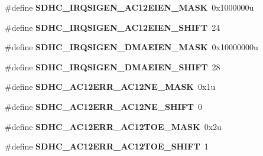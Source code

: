 \begin{DoxyCompactItemize}
\item 
\#define {\bfseries S\+D\+H\+C\+\_\+\+I\+R\+Q\+S\+I\+G\+E\+N\+\_\+\+A\+C12\+E\+I\+E\+N\+\_\+\+M\+A\+SK}~0x1000000u\hypertarget{group__SDHC__Register__Masks_gacd242a1e4fdf5a31371c37720b6c5067}{}\label{group__SDHC__Register__Masks_gacd242a1e4fdf5a31371c37720b6c5067}

\item 
\#define {\bfseries S\+D\+H\+C\+\_\+\+I\+R\+Q\+S\+I\+G\+E\+N\+\_\+\+A\+C12\+E\+I\+E\+N\+\_\+\+S\+H\+I\+FT}~24\hypertarget{group__SDHC__Register__Masks_gad4b0bff90f4a58266dbbcc018d9b4b56}{}\label{group__SDHC__Register__Masks_gad4b0bff90f4a58266dbbcc018d9b4b56}

\item 
\#define {\bfseries S\+D\+H\+C\+\_\+\+I\+R\+Q\+S\+I\+G\+E\+N\+\_\+\+D\+M\+A\+E\+I\+E\+N\+\_\+\+M\+A\+SK}~0x10000000u\hypertarget{group__SDHC__Register__Masks_gae22dd330ad7d3c84dc6906ad0303ccc5}{}\label{group__SDHC__Register__Masks_gae22dd330ad7d3c84dc6906ad0303ccc5}

\item 
\#define {\bfseries S\+D\+H\+C\+\_\+\+I\+R\+Q\+S\+I\+G\+E\+N\+\_\+\+D\+M\+A\+E\+I\+E\+N\+\_\+\+S\+H\+I\+FT}~28\hypertarget{group__SDHC__Register__Masks_gaceacd386a2b3cdab5975252cf61ad06c}{}\label{group__SDHC__Register__Masks_gaceacd386a2b3cdab5975252cf61ad06c}

\item 
\#define {\bfseries S\+D\+H\+C\+\_\+\+A\+C12\+E\+R\+R\+\_\+\+A\+C12\+N\+E\+\_\+\+M\+A\+SK}~0x1u\hypertarget{group__SDHC__Register__Masks_ga41337efa0e8891905b61ceef4b4f20d4}{}\label{group__SDHC__Register__Masks_ga41337efa0e8891905b61ceef4b4f20d4}

\item 
\#define {\bfseries S\+D\+H\+C\+\_\+\+A\+C12\+E\+R\+R\+\_\+\+A\+C12\+N\+E\+\_\+\+S\+H\+I\+FT}~0\hypertarget{group__SDHC__Register__Masks_ga5f00efec00a18073d07677099619160d}{}\label{group__SDHC__Register__Masks_ga5f00efec00a18073d07677099619160d}

\item 
\#define {\bfseries S\+D\+H\+C\+\_\+\+A\+C12\+E\+R\+R\+\_\+\+A\+C12\+T\+O\+E\+\_\+\+M\+A\+SK}~0x2u\hypertarget{group__SDHC__Register__Masks_ga8e4439265574a0caa1a8bfa16f98d304}{}\label{group__SDHC__Register__Masks_ga8e4439265574a0caa1a8bfa16f98d304}

\item 
\#define {\bfseries S\+D\+H\+C\+\_\+\+A\+C12\+E\+R\+R\+\_\+\+A\+C12\+T\+O\+E\+\_\+\+S\+H\+I\+FT}~1\hypertarget{group__SDHC__Register__Masks_ga9b67902a6fac916d2c9425c8262aebc5}{}\label{group__SDHC__Register__Masks_ga9b67902a6fac916d2c9425c8262aebc5}


\end{DoxyCompactItemize}
